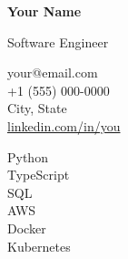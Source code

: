 \documentclass[10pt,a4paper]{article}
\begin{document}
\noindent
\begin{minipage}[t]{0.3\textwidth}
\colorbox{sidebarcolor}{\begin{minipage}[t][\textheight][t]{\textwidth}
\color{white}
\vspace{12pt}
\hspace{8pt}

{\large \textbf{Your Name}}

\vspace{8pt}
\hspace{8pt}
{\small Software Engineer}

\vspace{16pt}

\vspace{4pt}
\hspace{8pt}
{\footnotesize
your@email.com \\
\hspace{8pt}+1 (555) 000-0000 \\
\hspace{8pt}City, State \\
\hspace{8pt}\href{https://linkedin.com/in/you}{linkedin.com/in/you}
}

\vspace{16pt}

\vspace{4pt}
\hspace{8pt}
{\footnotesize
Python \\
\hspace{8pt}TypeScript \\
\hspace{8pt}SQL \\
\hspace{8pt}AWS \\
\hspace{8pt}Docker \\
\hspace{8pt}Kubernetes
}

\end{minipage}}
\end{minipage}%
\end{document}
